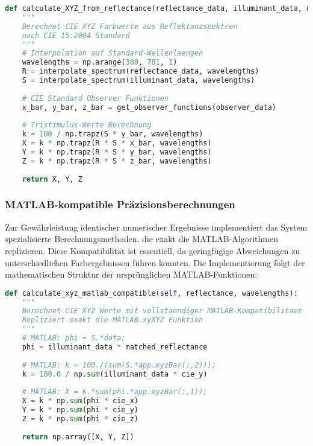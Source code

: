 \begin{lstlisting}[language=Python, caption=Kernfunktion für CIE XYZ Farbkonversion]
def calculate_XYZ_from_reflectance(reflectance_data, illuminant_data, observer_data):
    """
    Berechnet CIE XYZ Farbwerte aus Reflektanzspektren
    nach CIE 15:2004 Standard
    """
    # Interpolation auf Standard-Wellenlaengen
    wavelengths = np.arange(380, 781, 1)
    R = interpolate_spectrum(reflectance_data, wavelengths)
    S = interpolate_spectrum(illuminant_data, wavelengths) 
    
    # CIE Standard Observer Funktionen
    x_bar, y_bar, z_bar = get_observer_functions(observer_data)
    
    # Tristimulus-Werte Berechnung
    k = 100 / np.trapz(S * y_bar, wavelengths)
    X = k * np.trapz(R * S * x_bar, wavelengths)
    Y = k * np.trapz(R * S * y_bar, wavelengths)
    Z = k * np.trapz(R * S * z_bar, wavelengths)
    
    return X, Y, Z
\end{lstlisting}

\subsubsection{MATLAB-kompatible Präzisionsberechnungen}

Zur Gewährleistung identischer numerischer Ergebnisse implementiert das System spezialisierte Berechnungsmethoden, die exakt die MATLAB-Algorithmen replizieren. Diese Kompatibilität ist essentiell, da geringfügige Abweichungen zu unterschiedlichen Farbergebnissen führen könnten. Die Implementierung folgt der mathematischen Struktur der ursprünglichen MATLAB-Funktionen:

\begin{lstlisting}[language=Python, caption=MATLAB-kompatible XYZ Berechnung]
def calculate_xyz_matlab_compatible(self, reflectance, wavelengths):
    """
    Berechnet CIE XYZ Werte mit vollstaendiger MATLAB-Kompatibilitaet
    Repliziert exakt die MATLAB xyXYZ Funktion
    """
    # MATLAB: phi = S.*data;
    phi = illuminant_data * matched_reflectance
    
    # MATLAB: k = 100./(sum(S.*app.xyzBar(:,2)));
    k = 100.0 / np.sum(illuminant_data * cie_y)
    
    # MATLAB: X = k.*sum(phi.*app.xyzBar(:,1));
    X = k * np.sum(phi * cie_x)
    Y = k * np.sum(phi * cie_y)
    Z = k * np.sum(phi * cie_z)
    
    return np.array([X, Y, Z])
\end{lstlisting}

